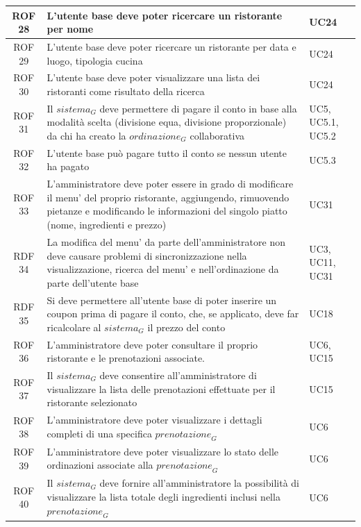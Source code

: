 \documentclass[12pt, oneside]{article}
\begin{document}
\begin{longtable}{|c|p{14cm}|p{2cm}|}
    \hline
    ROF 28 & L'utente base deve poter ricercare un ristorante per nome & UC24 \\
    \hline
    ROF 29 & L'utente base deve poter ricercare un ristorante per data e luogo, tipologia cucina & UC24 \\
    \hline
    ROF 30 & L'utente base deve poter visualizzare una lista dei ristoranti come risultato della ricerca & UC24 \\
    \hline
    ROF 31 & Il $\textit{sistema}_G$ deve permettere di pagare il conto in base alla modalità scelta (divisione equa, divisione proporzionale) da chi ha creato la $\textit{ordinazione}_G$ collaborativa & UC5, UC5.1, UC5.2 \\
    \hline
    ROF 32 & L'utente base può pagare tutto il conto se nessun utente ha pagato & UC5.3 \\
    \hline
    ROF 33 & L'amministratore deve poter essere in grado di modificare il menu' del proprio ristorante, aggiungendo, rimuovendo pietanze e modificando le informazioni del singolo piatto (nome, ingredienti e prezzo) & UC31 \\
    \hline
    RDF 34 & La modifica del menu' da parte dell'amministratore non deve causare problemi di sincronizzazione nella visualizzazione, ricerca del menu' e nell'ordinazione da parte dell'utente base &  UC3, UC11, UC31 \\
    \hline
    RDF 35 & Si deve permettere all'utente base di poter inserire un coupon prima di pagare il conto, che, se applicato, deve far ricalcolare al $\textit{sistema}_G$ il prezzo del conto & UC18 \\
    \hline
    ROF 36 & L'amministratore deve poter consultare il proprio ristorante e le prenotazioni associate. & UC6, UC15 \\
    \hline
    ROF 37 & Il $\textit{sistema}_G$ deve consentire all'amministratore di visualizzare la lista delle prenotazioni effettuate per il ristorante selezionato & UC15 \\
    \hline
    ROF 38 & L'amministratore deve poter visualizzare i dettagli completi di una specifica $\textit{prenotazione}_G$ & UC6 \\
    \hline
    ROF 39 & L'amministratore deve poter visualizzare lo stato delle ordinazioni associate alla $\textit{prenotazione}_G$ & UC6 \\
    \hline
    ROF 40 & Il $\textit{sistema}_G$ deve fornire all'amministratore la possibilità di visualizzare la lista totale degli ingredienti inclusi nella $\textit{prenotazione}_G$ & UC6 \\

\end{longtable}
\end{document}
